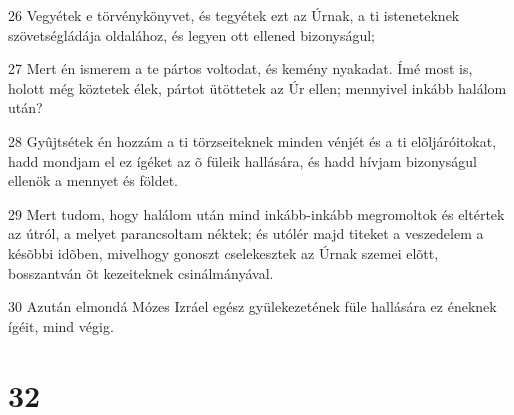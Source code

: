 \par 26 Vegyétek e törvénykönyvet, és tegyétek ezt az Úrnak, a ti isteneteknek szövetségládája oldalához, és legyen ott ellened bizonyságul;
\par 27 Mert én ismerem a te pártos voltodat, és kemény nyakadat. Ímé most is, holott még köztetek élek, pártot ütöttetek az Úr ellen; mennyivel inkább halálom után?
\par 28 Gyûjtsétek én hozzám a ti törzseiteknek minden vénjét és a ti elõljáróitokat, hadd mondjam el ez ígéket az õ füleik hallására, és hadd hívjam bizonyságul ellenök a mennyet és földet.
\par 29 Mert tudom, hogy halálom után mind inkább-inkább megromoltok és eltértek az útról, a melyet parancsoltam néktek; és utólér majd titeket a veszedelem a késõbbi idõben, mivelhogy gonoszt cselekesztek az Úrnak szemei elõtt, bosszantván õt kezeiteknek csinálmányával.
\par 30 Azután elmondá Mózes Izráel egész gyülekezetének füle hallására ez éneknek ígéit, mind végig.

\chapter{32}

